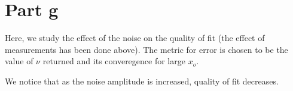 \documentclass[11pt]{article}
\begin{document}
    \begin{center}
    \end{center}
    { \hspace*{\fill} \\}
    
    \begin{center}
    \end{center}
    { \hspace*{\fill} \\}
    
    \begin{center}
    \end{center}
    { \hspace*{\fill} \\}
    
    \hypertarget{part-g}{%
\section{Part g}\label{part-g}}

Here, we study the effect of the noise on the quality of fit (the effect
of measurements has been done above). The metric for error is chosen to
be the value of \(\nu\) returned and its converegence for large \(x_o\).

We notice that as the noise amplitude is increased, quality of fit
decreases.
\end{document}
